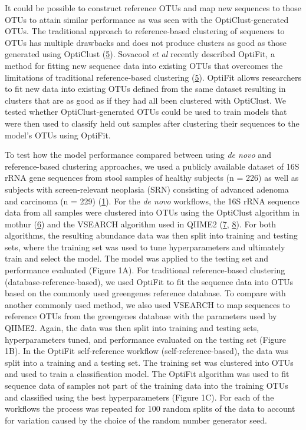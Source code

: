\documentclass[
]{article}
\begin{document}
It could be possible to construct reference OTUs and map new sequences
to those OTUs to attain similar performance as was seen with the
OptiClust-generated OTUs. The traditional approach to reference-based
clustering of sequences to OTUs has multiple drawbacks and does not
produce clusters as good as those generated using OptiClust
(\protect\hyperlink{ref-sovacool2022}{5}). Sovacool \emph{et al}
recently described OptiFit, a method for fitting new sequence data into
existing OTUs that overcomes the limitations of traditional
reference-based clustering (\protect\hyperlink{ref-sovacool2022}{5}).
OptiFit allows researchers to fit new data into existing OTUs defined
from the same dataset resulting in clusters that are as good as if they
had all been clustered with OptiClust. We tested whether
OptiClust-generated OTUs could be used to train models that were then
used to classify held out samples after clustering their sequences to
the model's OTUs using OptiFit.

To test how the model performance compared between using \emph{de novo}
and reference-based clustering approaches, we used a publicly available
dataset of 16S rRNA gene sequences from stool samples of healthy
subjects (n = 226) as well as subjects with screen-relevant neoplasia
(SRN) consisting of advanced adenoma and carcinoma (n = 229)
(\protect\hyperlink{ref-baxter2016}{1}). For the \emph{de novo}
workflows, the 16S rRNA sequence data from all samples were clustered
into OTUs using the OptiClust algorithm in mothur
(\protect\hyperlink{ref-westcott2017}{6}) and the VSEARCH algorithm used
in QIIME2 (\protect\hyperlink{ref-rognes2016}{7},
\protect\hyperlink{ref-bolyen2019}{8}). For both algorithms, the
resulting abundance data was then split into training and testing sets,
where the training set was used to tune hyperparameters and ultimately
train and select the model. The model was applied to the testing set and
performance evaluated (Figure 1A). For traditional reference-based
clustering (database-reference-based), we used OptiFit to fit the
sequence data into OTUs based on the commonly used greengenes reference
database. To compare with another commonly used method, we also used
VSEARCH to map sequences to reference OTUs from the greengenes database
with the parameters used by QIIME2. Again, the data was then split into
training and testing sets, hyperparameters tuned, and performance
evaluated on the testing set (Figure 1B). In the OptiFit self-reference
workflow (self-reference-based), the data was split into a training and
a testing set. The training set was clustered into OTUs and used to
train a classification model. The OptiFit algorithm was used to fit
sequence data of samples not part of the training data into the training
OTUs and classified using the best hyperparameters (Figure 1C). For each
of the workflows the process was repeated for 100 random splits of the
data to account for variation caused by the choice of the random number
generator seed.
\end{document}
